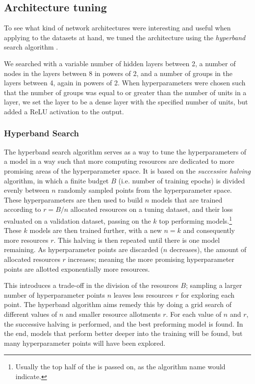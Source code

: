 \subsection{Architecture tuning}
    To see what kind of network architectures were interesting and useful when applying to the datasets at hand, we tuned the architecture using the \textit{hyperband} search algorithm \citep{Hyperband}.

    We searched with a variable number of hidden layers between 2, a number of nodes in the layers between 8 in powers of 2, and a number of groups in the layers between 4, again in powers of 2. When hyperparameters were chosen such that the number of groups was equal to or greater than the number of units in a layer, we set the layer to be a dense layer with the specified number of units, but added a ReLU activation to the output.

    \subsubsection{Hyperband Search}
        The hyperband search algorithm serves as a way to tune the hyperparameters of a model in a way such that more computing resources are dedicated to more promising areas of the hyperparameter space. It is based on the \textit{successive halving} algorithm, in which a finite budget $B$ (i.e. number of training epochs) is divided evenly between $n$ randomly sampled points from the hyperparameter space. These hyperparameters are then used to build $n$ models that are trained according to $r = B/n$ allocated resources on a tuning dataset, and their loss evaluated on a validation dataset, passing on the $k$ top performing models.\footnote{Usually the top half of the is passed on, as the algorithm name would indicate.} 
        These $k$ models are then trained further, with a new $n=k$ and consequently more resources $r$. This halving is then repeated until there is one model remaining. As hyperparameter points are discarded ($n$ decreases), the amount of allocated resources $r$ increases; meaning the more promising hyperparameter points are allotted exponentially more resources.

        This introduces a trade-off in the division of the resources $B$; sampling a larger number of hyperparameter points $n$ leaves less resources $r$ for exploring each point. The hyperband algorithm aims remedy this by doing a grid search of different values of $n$ and smaller resource allotments $r$. For each value of $n$ and $r$, the successive halving is performed, and the best preforming model is found. In the end, models that perform better deeper into the training will be found, but many hyperparameter points will have been explored.

